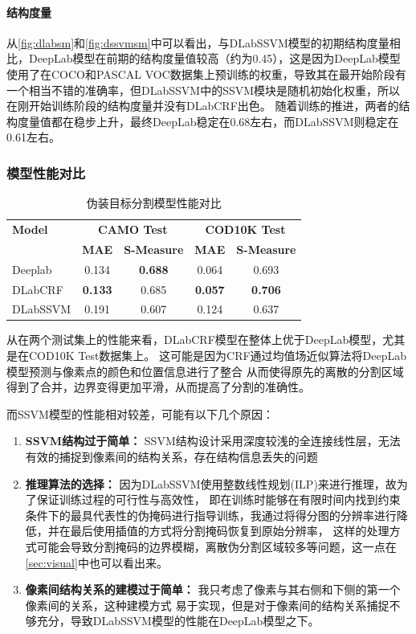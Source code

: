 \documentclass[a4paper,12pt]{ctexart}
\begin{document}
\paragraph{结构度量}从\ref{fig:dlabsm}和\ref{fig:dssvmsm}中可以看出，与DLabSSVM模型的初期结构度量相比，DeepLab模型在前期的结构度量值较高（约为0.45），这是因为DeepLab模型使用了在COCO和PASCAL VOC数据集上预训练的权重，导致其在最开始阶段有一个相当不错的准确率，但DLabSSVM中的SSVM模块是随机初始化权重，所以在刚开始训练阶段的结构度量并没有DLabCRF出色。
随着训练的推进，两者的结构度量值都在稳步上升，最终DeepLab稳定在0.68左右，而DLabSSVM则稳定在0.61左右。





\subsubsection{模型性能对比}

\begin{table}[h!]
    \centering
    \begin{tabular}{|l|c|c|c|c|}
    \hline
    \textbf{Model} & \multicolumn{2}{c|}{\textbf{CAMO Test}} & \multicolumn{2}{c|}{\textbf{COD10K Test}} \\
    \cline{2-5}
     & \textbf{MAE} & \textbf{S-Measure} & \textbf{MAE} & \textbf{S-Measure} \\
    \hline
    Deeplab & 0.134 & \textbf{0.688} & 0.064 & 0.693 \\
    DLabCRF & \textbf{0.133} & 0.685 & \textbf{0.057} & \textbf{0.706} \\
    DLabSSVM & 0.191 & 0.607 & 0.124 & 0.637 \\
    \hline
    \end{tabular}
    \caption{伪装目标分割模型性能对比}
\end{table}

从在两个测试集上的性能来看，DLabCRF模型在整体上优于DeepLab模型，尤其是在COD10K Test数据集上。
这可能是因为CRF通过均值场近似算法将DeepLab模型预测与像素点的颜色和位置信息进行了整合
从而使得原先的离散的分割区域得到了合并，边界变得更加平滑，从而提高了分割的准确性。

而SSVM模型的性能相对较差，可能有以下几个原因：
\begin{enumerate}
    \item \textbf{SSVM结构过于简单：} SSVM结构设计采用深度较浅的全连接线性层，无法有效的捕捉到像素间的结构关系，存在结构信息丢失的问题
    \item \textbf{推理算法的选择：} 因为DLabSSVM使用整数线性规划(ILP)来进行推理，故为了保证训练过程的可行性与高效性，
    即在训练时能够在有限时间内找到约束条件下的最具代表性的伪掩码进行指导训练，我通过将得分图的分辨率进行降低，并在最后使用插值的方式将分割掩码恢复到原始分辨率，
    这样的处理方式可能会导致分割掩码的边界模糊，离散伪分割区域较多等问题，这一点在\ref{sec:visual}中也可以看出来。
    \item \textbf{像素间结构关系的建模过于简单：} 我只考虑了像素与其右侧和下侧的第一个像素间的关系，这种建模方式
    易于实现，但是对于像素间的结构关系捕捉不够充分，导致DLabSSVM模型的性能在DeepLab模型之下。
\end{enumerate}
\end{document}
